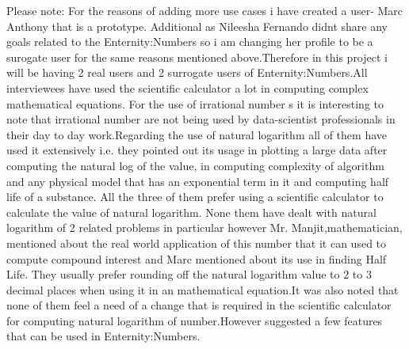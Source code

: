 \documentclass[12pt]{article}
\begin{document}
Please note: For the reasons of adding more use cases i have created a user- Marc Anthony that is a prototype.
Additional as Nileesha Fernando didnt share any goals related to the Enternity:Numbers so i am changing her profile to be a surogate user for the same reasons mentioned above.Therefore in this project i will be having 2 real users and 2 surrogate users of Enternity:Numbers.All interviewees have used the scientific calculator a lot in computing complex mathematical equations.
For the use of irrational number s it is interesting to note that irrational number are not being used by  data-scientist professionals in their day to day work.Regarding the use of natural logarithm all of them have used it extensively i.e. they pointed out its usage in plotting a large data after computing the natural log of the value, in computing complexity of algorithm and any physical model that has an exponential term in it and computing half life of a substance. All the three of them prefer using a scientific calculator to calculate the value of natural logarithm.
 None them have dealt with natural logarithm of 2 related problems in particular however Mr. Manjit,mathematician, mentioned about the real world application of this number that it can used to compute compound interest and Marc mentioned about its use in finding Half Life. They usually prefer rounding off the natural logarithm value to 2 to 3 decimal places when using it in an mathematical equation.It was also noted that none of them feel a need of a change that is required in the scientific calculator for computing natural logarithm of number.However suggested a few features that can be used in Enternity:Numbers.
\end{document}
